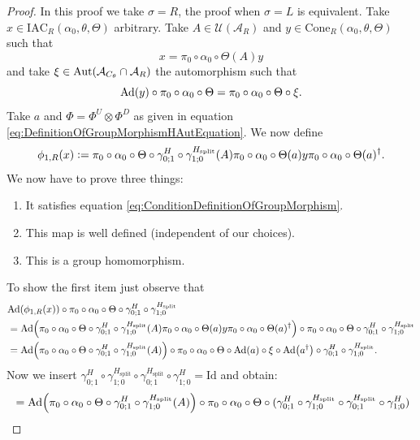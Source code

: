 \documentclass[12pt,a4paper,twoside]{article}
\newcommand{\IAC}{\textrm{IAC}}
\newcommand{\defeq}{\vcentcolon=}
\let\originalleft\left
\let\originalright\right
\renewcommand{\left}{\mathopen{}\mathclose\bgroup\originalleft}
\renewcommand{\right}{\aftergroup\egroup\originalright}
\newcommand{\UU}{\mathcal U}
\renewcommand{\AA}{\mathcal A}
\newcommand{\Ad}[1]{\textrm{Ad}\left(#1\right)}
\newcommand{\Aut}[1]{\textrm{Aut}\left(#1\right)}
\theoremstyle{definition}
\numberwithin{equation}{section}
\begin{document}
\begin{proof}
	In this proof we take $\sigma=R$, the proof when $\sigma=L$ is equivalent. Take $x\in \IAC_R(\alpha_0,\theta,\Theta)$ arbitrary. Take $A\in\UU(\AA_R)$ and $y\in\textrm{Cone}_R(\alpha_0,\theta,\Theta)$ such that
	\begin{equation}
	x=\pi_0\circ\alpha_0\circ\Theta(A)y
	\end{equation}
	and take $\xi\in\Aut{\AA_{C_\theta}\cap \AA_R}$ the automorphism such that
	\begin{equation}
	\Ad{y}\circ\pi_0\circ\alpha_0\circ\Theta=\pi_0\circ\alpha_0\circ\Theta\circ\xi.
	\end{equation}
	Take $a$ and $\Phi=\Phi^U\otimes\Phi^D$ as given in equation \eqref{eq:DefinitionOfGroupMorphismHAutEquation}. We now define
	\begin{equation}
		\phi_{1,R}(x)\defeq \pi_0\circ\alpha_0\circ\Theta\circ\gamma^H_{0;1}\circ\gamma^{H_\text{split}}_{1;0}(A)\pi_0\circ\alpha_0\circ\Theta(a)y\pi_0\circ\alpha_0\circ\Theta(a)^\dagger.
	\end{equation}
	We now have to prove three things:
	\begin{enumerate}
		\item It satisfies equation \eqref{eq:ConditionDefinitionOfGroupMorphism}.
		\item This map is well defined (independent of our choices).
		\item This is a group homomorphism.
	\end{enumerate}
	To show the first item just observe that
	\begin{align}
		&\Ad{\phi_{1,R}(x)}\circ\pi_0\circ\alpha_0\circ\Theta\circ\gamma^H_{0;1}\circ\gamma^{H_\text{split}}_{1;0}\\
		&=\Ad{\pi_0\circ\alpha_0\circ\Theta\circ\gamma^H_{0;1}\circ\gamma^{H_\text{split}}_{1;0}(A)\pi_0\circ\alpha_0\circ\Theta(a)y\pi_0\circ\alpha_0\circ\Theta(a)^\dagger}\circ\pi_0\circ\alpha_0\circ\Theta\circ\gamma^H_{0;1}\circ\gamma^{H_\text{split}}_{1;0}\\
		&=\Ad{\pi_0\circ\alpha_0\circ\Theta\circ\gamma^H_{0;1}\circ\gamma^{H_\text{split}}_{1;0}(A)}\circ\pi_0\circ\alpha_0\circ\Theta\circ\Ad{a}\circ\xi\circ\Ad{a^\dagger}\circ\gamma^H_{0;1}\circ\gamma^{H_\text{split}}_{1;0}.
	\end{align}
	Now we insert $\gamma^H_{0;1}\circ\gamma^{H_\text{split}}_{1;0}\circ\gamma^{H_\text{split}}_{0;1}\circ\gamma^H_{1;0}=\text{Id}$ and obtain:
	\begin{align}
		&=\Ad{\pi_0\circ\alpha_0\circ\Theta\circ\gamma^H_{0;1}\circ\gamma^{H_\text{split}}_{1;0}(A)}\circ\pi_0\circ\alpha_0\circ\Theta\circ(\gamma^H_{0;1}\circ\gamma^{H_\text{split}}_{1;0}\circ\gamma^{H_\text{split}}_{0;1}\circ\gamma^H_{1;0})\\

\end{align}
\end{proof}
\end{document}
